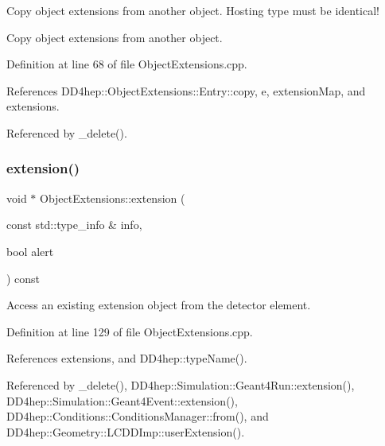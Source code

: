 Copy object extensions from another object. Hosting type must be identical! 

Copy object extensions from another object. 

Definition at line 68 of file Object\+Extensions.\+cpp.



References D\+D4hep\+::\+Object\+Extensions\+::\+Entry\+::copy, e, extension\+Map, and extensions.



Referenced by \+\_\+delete().

\hypertarget{class_d_d4hep_1_1_object_extensions_a99f915911010e0c716938e3ec848ff7b}{}\label{class_d_d4hep_1_1_object_extensions_a99f915911010e0c716938e3ec848ff7b} 
\subsubsection{\texorpdfstring{extension()}{extension()}\hspace{0.1cm}{\footnotesize\ttfamily [1/2]}}
{\footnotesize\ttfamily void $\ast$ Object\+Extensions\+::extension (\begin{DoxyParamCaption}\item[{const std\+::type\+\_\+info \&}]{info,  }\item[{bool}]{alert }\end{DoxyParamCaption}) const}



Access an existing extension object from the detector element. 



Definition at line 129 of file Object\+Extensions.\+cpp.



References extensions, and D\+D4hep\+::type\+Name().



Referenced by \+\_\+delete(), D\+D4hep\+::\+Simulation\+::\+Geant4\+Run\+::extension(), D\+D4hep\+::\+Simulation\+::\+Geant4\+Event\+::extension(), D\+D4hep\+::\+Conditions\+::\+Conditions\+Manager\+::from(), and D\+D4hep\+::\+Geometry\+::\+L\+C\+D\+D\+Imp\+::user\+Extension().

\hypertarget{class_d_d4hep_1_1_object_extensions_a61c801252545f49ea1e0af177e7016eb}{}\label{class_d_d4hep_1_1_object_extensions_a61c801252545f49ea1e0af177e7016eb} 
